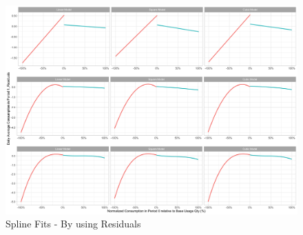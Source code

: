\begin{figure}
    \centering
    \includegraphics[scale = 0.085]{02_Plots/SMUD-Billing-Data_RD-Approach_Residuals_BW-NA}
    \caption{Spline Fits - By using Residuals}
    \label{Figure:Residuals_NA}
\end{figure}




